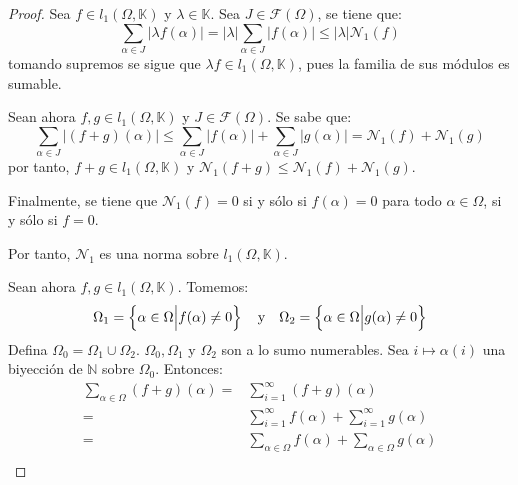 \documentclass[12pt]{report}
\theoremstyle{largebreak}
\newcommand\abs[1]{\ensuremath{\big|#1\big|}}
\begin{document}
    \begin{proof}
        Sea $f\in l_1(\Omega,\mathbb{K})$ y $\lambda\in\mathbb{K}$. Sea $J\in\mathcal{F}(\Omega)$, se tiene que:
        \begin{equation*}
            \sum_{\alpha\in J }\abs{\lambda f(\alpha)}=\abs{\lambda} \sum_{\alpha\in J }\abs{f(\alpha)}\leq\abs{\lambda}\mathcal{N}_1(f)
        \end{equation*}
        tomando supremos se sigue que $\lambda f\in l_1(\Omega,\mathbb{K})$, pues la familia de sus módulos es sumable.

        Sean ahora $f,g\in l_1(\Omega,\mathbb{K})$ y $J\in\mathcal{F}(\Omega)$. Se sabe que:
        \begin{equation*}
            \sum_{\alpha\in J }\abs{(f+g)(\alpha)}\leq \sum_{\alpha\in J }\abs{f(\alpha)}+\sum_{\alpha\in J }\abs{g(\alpha)}=\mathcal{N}_1(f)+\mathcal{N}_1(g)
        \end{equation*}
        por tanto, $f+g\in l_1(\Omega,\mathbb{K})$ y $\mathcal{N}_1(f+g)\leq\mathcal{N}_1(f)+\mathcal{N}_1(g)$.

        Finalmente, se tiene que $\mathcal{N}_1(f)=0$ si y sólo si $f(\alpha)=0$ para todo $\alpha\in\Omega$, si y sólo si $f=0$.

        Por tanto, $\mathcal{N}_1$ es una norma sobre $l_1(\Omega,\mathbb{K})$.

        Sean ahora $f,g\in l_1(\Omega,\mathbb{K})$. Tomemos:
        \begin{equation*}
            \Omega_1=\left\{\alpha\in\Omega\Big|f(\alpha)\neq0 \right\}\quad\textup{y}\quad\Omega_2=\left\{\alpha\in\Omega\Big|g(\alpha)\neq0 \right\}
        \end{equation*}
        Defina $\Omega_0=\Omega_1\cup\Omega_2$. $\Omega_0,\Omega_1$ y $\Omega_2$ son a lo sumo numerables. Sea $i\mapsto\alpha(i)$ una biyección de $\mathbb{N}$ sobre $\Omega_0$. Entonces:
        \begin{equation*}
            \begin{split}
                \sum_{\alpha\in\Omega }(f+g)(\alpha)=&\sum_{i=1 }^\infty(f+g)(\alpha)\\
                =&\sum_{i=1 }^\infty f(\alpha)+\sum_{i=1 }^\infty g(\alpha)\\
                =&\sum_{\alpha\in\Omega }f(\alpha)+\sum_{\alpha\in\Omega }g(\alpha)\\
            \end{split}
        \end{equation*}
    \end{proof}
\end{document}

